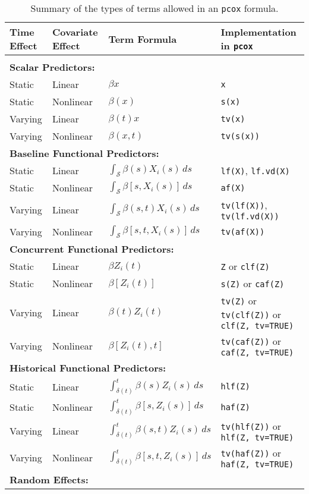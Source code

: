 \documentclass[12pt]{article}
\begin{document}
\begin{table}[t]
\centering
\caption{Summary of the types of terms allowed in an \texttt{pcox} formula.\label{tab:terms}}
\begin{tabular}{llll}
\bf Time Effect & \bf Covariate Effect & \bf Term Formula & \bf Implementation in \texttt{pcox}  \\[1ex]
\hline \\[-1.5ex]
\multicolumn{4}{l}{\bf Scalar Predictors:} \\
Static	& Linear	& $\beta x$	& \texttt{x} \\
Static	& Nonlinear	& $\beta(x)$	& \texttt{s(x)} \\
Varying	& Linear	& $\beta(t) x$	& \texttt{tv(x)} \\
Varying	& Nonlinear	& $\beta(x,t)$	& \texttt{tv(s(x))} \\[2ex]
\multicolumn{4}{l}{\bf Baseline Functional Predictors:} \\
Static	& Linear	& $\int_{\mathcal{S}} \beta(s)X_i(s)\,ds$		& \texttt{lf(X)}, \texttt{lf.vd(X)} \\
Static	& Nonlinear	& $\int_{\mathcal{S}} \beta[s,X_i(s)]\,ds$		& \texttt{af(X)}\\
Varying	& Linear	& $\int_{\mathcal{S}} \beta(s,t)X_i(s)\,ds$	& \texttt{tv(lf(X))}, \texttt{tv(lf.vd(X))} \\
Varying	& Nonlinear	& $\int_{\mathcal{S}} \beta[s,t,X_i(s)]\, ds$	& \texttt{tv(af(X))} \\[2ex]
\multicolumn{4}{l}{\bf Concurrent Functional Predictors:} \\
Static	& Linear	& $\beta Z_i(t)$		& \texttt{Z} or \texttt{clf(Z)} \\
Static	& Nonlinear	& $\beta[Z_i(t)]$		& \texttt{s(Z)} or \texttt{caf(Z)} \\
Varying	& Linear	& $\beta(t) Z_i(t)$	& \texttt{tv(Z)} or \texttt{tv(clf(Z))} or \texttt{clf(Z, tv=TRUE)} \\
Varying	& Nonlinear	& $\beta[Z_i(t), t]$		& \texttt{tv(caf(Z))} or \texttt{caf(Z, tv=TRUE)}\\[2ex]
\multicolumn{4}{l}{\bf Historical Functional Predictors:} \\
Static	& Linear	& $\int_{\delta(t)}^t \beta(s)Z_i(s)\,ds$	& \texttt{hlf(Z)} \\
Static	& Nonlinear	& $\int_{\delta(t)}^t \beta[s, Z_i(s)]\,ds$	& \texttt{haf(Z)} \\
Varying	& Linear	& $\int_{\delta(t)}^t \beta(s,t)Z_i(s)\,ds$	& \texttt{tv(hlf(Z))} or \texttt{hlf(Z, tv=TRUE)} \\
Varying	& Nonlinear	& $\int_{\delta(t)}^t \beta[s, t, Z_i(s)]\,ds$	& \texttt{tv(haf(Z))} or \texttt{haf(Z, tv=TRUE)} \\[2ex]
\multicolumn{4}{l}{\bf Random Effects:} \\
\end{tabular}
\end{table}
\end{document}
